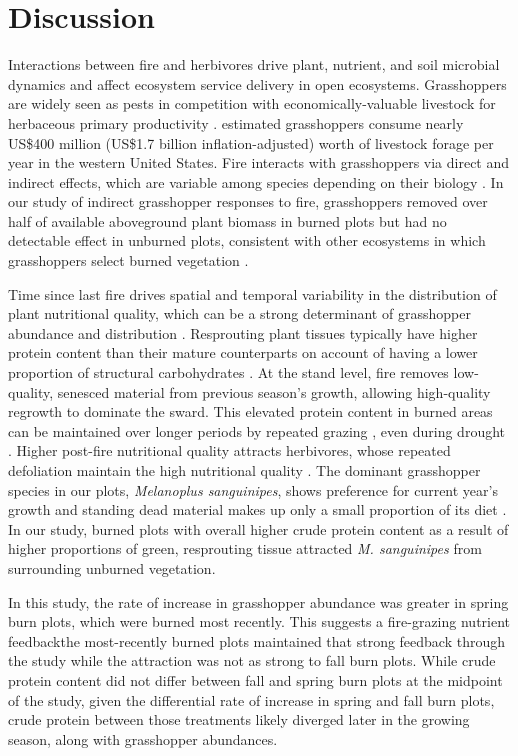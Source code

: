 \documentclass[referee, 
	            sn-basic]
           {sn-jnl}
\begin{document}
\section{Discussion}

Interactions between fire and herbivores drive plant, nutrient, and soil microbial dynamics and affect ecosystem service delivery in open ecosystems.
Grasshoppers are widely seen as pests in competition with economically-valuable livestock for herbaceous primary productivity \citep{zhang2019}. 
\citet{hewitt1983} estimated grasshoppers consume nearly US\$400 million (US\$1.7 billion inflation-adjusted) worth of livestock forage per year in the western United States.  
Fire interacts with grasshoppers via direct and indirect effects, which are variable among species depending on their biology \citep[e.g.][]{vermeire2004}. 
In our study of indirect grasshopper responses to fire, grasshoppers removed over half of available aboveground plant biomass in burned plots but had no detectable effect in unburned plots, consistent with other ecosystems in which grasshoppers select burned vegetation \citep{stein1992, lopes2011}.

Time since last fire drives spatial and temporal variability in the distribution of plant nutritional quality, which can be a strong determinant of grasshopper abundance and distribution \citep{white2012, joern2012, ozment2021}. 
Resprouting plant tissues typically have higher protein content than their mature counterparts on account of having a lower proportion of structural carbohydrates \citep{mcgranahan2021}. 
At the stand level, fire removes low-quality, senesced material from previous season's growth, allowing high-quality regrowth to dominate the sward.  
This elevated protein content in burned areas can be maintained over longer periods by repeated grazing \citep{wanchuk2021}, even during drought \citep{spiess2020}. 
Higher post-fire nutritional quality attracts herbivores, whose repeated defoliation maintain the high nutritional quality \citep{allred2011, archibald2005, sensenig2010}. 
The dominant grasshopper species in our plots, \emph{Melanoplus sanguinipes}, shows preference for current year's growth and standing dead material makes up only a small proportion of its diet \citep{anderson1952, mulkern1962}.
In our study, burned plots with overall higher crude protein content as a result of higher proportions of green, resprouting tissue attracted \emph{M. sanguinipes} from surrounding unburned vegetation.

In this study, the rate of increase in grasshopper abundance was greater in spring burn plots, which were burned most recently.  
This suggests a fire-grazing nutrient feedback\textemdash the most-recently burned plots maintained that strong feedback through the study while the attraction was not as strong to fall burn plots. 
While crude protein content did not differ between fall and spring burn plots at the midpoint of the study, given the differential rate of increase in spring and fall burn plots, crude protein between those treatments likely diverged later in the growing season, along with grasshopper abundances. 
\end{document}
